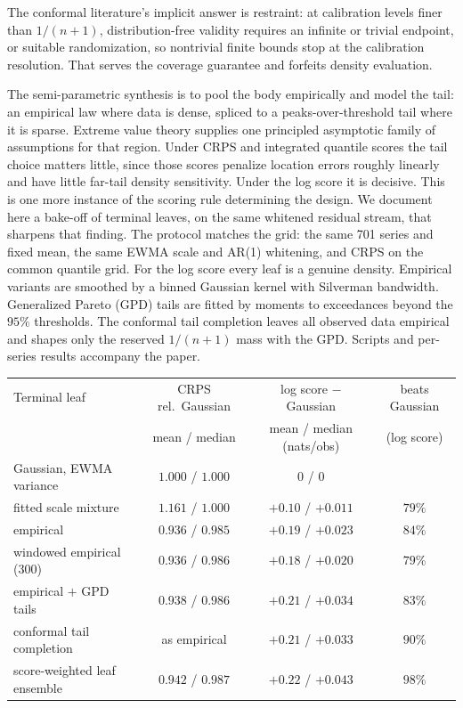 \documentclass[11pt]{article}
\theoremstyle{remark}
\begin{document}
The conformal literature's implicit answer is restraint: at calibration levels finer than
$1/(n{+}1)$, distribution-free validity requires an infinite or trivial endpoint, or suitable
randomization, so nontrivial finite bounds stop at the calibration resolution. That serves the coverage guarantee and forfeits density evaluation.

The semi-parametric synthesis is to pool the body empirically and model the tail: an
empirical law where data is dense, spliced to a peaks-over-threshold tail where it is sparse.
Extreme value theory supplies one principled asymptotic family of assumptions for that
region. Under CRPS and integrated quantile scores the tail choice matters little, since those
scores penalize location errors roughly linearly and have little far-tail density
sensitivity. Under the log score it is decisive. This is one more instance of the scoring rule determining the design. We document here a bake-off of terminal leaves, on the same whitened residual stream, that
sharpens that finding.
The protocol matches the grid: the same 701 series and fixed mean, the same EWMA scale and
AR(1) whitening, and CRPS on the common quantile grid. For the log score every leaf is a
genuine density. Empirical variants are smoothed by a binned Gaussian kernel with Silverman
bandwidth. Generalized Pareto (GPD) tails are fitted by moments to exceedances beyond the
$95\%$ thresholds. The conformal tail completion leaves all observed data empirical and
shapes only the reserved $1/(n{+}1)$ mass with the GPD. Scripts and per-series results accompany the paper.

\begin{center}
\small
\begin{tabular}{lccc}
\toprule
Terminal leaf & CRPS rel.\ Gaussian & log score $-$ Gaussian & beats Gaussian\\
 & mean / median & mean / median (nats/obs) & (log score)\\
\midrule
Gaussian, EWMA variance & $1.000$ / $1.000$ & $0$ / $0$ & \\
fitted scale mixture & $1.161$ / $1.000$ & $+0.10$ / $+0.011$ & $79\%$\\
empirical & $0.936$ / $0.985$ & $+0.19$ / $+0.023$ & $84\%$\\
windowed empirical (300) & $0.936$ / $0.986$ & $+0.18$ / $+0.020$ & $79\%$\\
empirical $+$ GPD tails & $0.938$ / $0.986$ & $+0.21$ / $+0.034$ & $83\%$\\
conformal tail completion & as empirical & $+0.21$ / $+0.033$ & $90\%$\\
score-weighted leaf ensemble & $0.942$ / $0.987$ & $+0.22$ / $+0.043$ & $98\%$\\
\bottomrule
\end{tabular}
\end{center}
\end{document}
